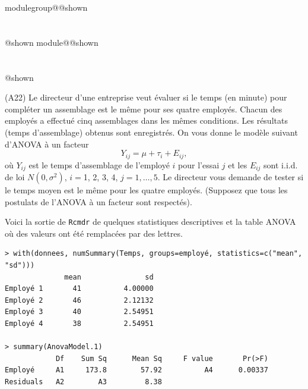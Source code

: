 \documentclass{Evaluation}
\makeatletter
\newcommand{\currentmodulekey}{}
\newcommand{\currentmoduletitle}{}
\newcommand{\currentgroupkey}{}
\newcommand{\currentgrouptitle}{}
\newcommand{\showmoduleifneeded}{%
  \ifx\currentgroupkey\empty\else
    \expandafter\ifx\csname modulegroup@\currentgroupkey @shown\endcsname\relax
      \section*{\currentgrouptitle}%
      \expandafter\gdef\csname modulegroup@\currentgroupkey @shown\endcsname{1}%
    \fi
  \fi
  \expandafter\ifx\csname module@\currentmodulekey @shown\endcsname\relax
    \section*{\currentmoduletitle}%
    \expandafter\gdef\csname module@\currentmodulekey @shown\endcsname{1}%
  \fi
}
\newenvironment{A22}{\showmoduleifneeded}{}
\makeatother
\begin{document}
\begin{questions}
\begin{A22}
\question
(A22) 
Le directeur d'une entreprise veut évaluer si le temps (en minute) pour compléter un assemblage est le même pour ses quatre employés. Chacun des employés a effectué cinq assemblages dans les mêmes conditions. Les résultats (temps d'assemblage) obtenus sont enregistrés. 
On vous donne le modèle suivant d'ANOVA à un facteur
$$Y_{ij}=\mu+\tau_i+E_{ij},$$
où $Y_{ij}$ est le temps d'assemblage de l'employé $i$ pour l'essai $j$ et
les $E_{ij}$ sont i.i.d. de loi $N(0,\sigma^2)$, $i=$1, 2, 3, 4,
$j=1,\ldots,5$. 
Le directeur vous demande de tester si le temps moyen est le même pour les quatre employés.
(Supposez que tous les postulats de l'ANOVA à un facteur sont respectés).\medskip

Voici la sortie de \texttt{Rcmdr} de quelques statistiques descriptives et la table ANOVA où des valeurs ont été remplacées par des lettres.

\begin{verbatim} 
> with(donnees, numSummary(Temps, groups=employé, statistics=c("mean", "sd")))
              mean               sd
Employé 1       41          4.00000
Employé 2       46          2.12132
Employé 3       40          2.54951
Employé 4       38          2.54951

> summary(AnovaModel.1)
            Df    Sum Sq      Mean Sq     F value       Pr(>F)
Employé     A1     173.8        57.92          A4      0.00337
Residuals   A2        A3         8.38
\end{verbatim}

\end{A22}
\end{questions}
\end{document}
